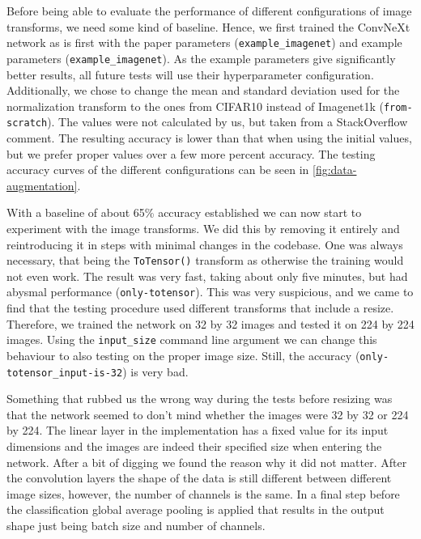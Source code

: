 \documentclass{article}
\begin{document}
    Before being able to evaluate the performance of different configurations of image transforms, we need some kind of baseline.
    Hence, we first trained the ConvNeXt network as is first with the paper parameters (\texttt{example\_imagenet}) and example parameters (\texttt{example\_imagenet}).
    As the example parameters give significantly better results, all future tests will use their hyperparameter configuration.
    Additionally, we chose to change the mean and standard deviation used for the normalization transform to the ones from CIFAR10 instead of Imagenet1k (\texttt{from-scratch}).
    The values were not calculated by us, but taken from a StackOverflow\cite{stackoverflow} comment.
    The resulting accuracy is lower than that when using the initial values, but we prefer proper values over a few more percent accuracy.
    The testing accuracy curves of the different configurations can be seen in \autoref{fig:data-augmentation}.

    With a baseline of about 65\% accuracy established we can now start to experiment with the image transforms.
    We did this by removing it entirely and reintroducing it in steps with minimal changes in the codebase.
    One was always necessary, that being the \texttt{ToTensor()} transform as otherwise the training would not even work.
    The result was very fast, taking about only five minutes, but had abysmal performance (\texttt{only-totensor}).
    This was very suspicious, and we came to find that the testing procedure used different transforms that include a resize.
    Therefore, we trained the network on 32 by 32 images and tested it on 224 by 224 images.
    Using the \texttt{input\_size} command line argument we can change this behaviour to also testing on the proper image size.
    Still, the accuracy (\texttt{only-totensor\_input-is-32}) is very bad.

    Something that rubbed us the wrong way during the tests before resizing was that the network seemed to don't mind whether the images were 32 by 32 or 224 by 224.
    The linear layer in the implementation has a fixed value for its input dimensions and the images are indeed their specified size when entering the network.
    After a bit of digging we found the reason why it did not matter.
    After the convolution layers the shape of the data is still different between different image sizes, however, the number of channels is the same.
    In a final step before the classification global average pooling is applied that results in the output shape just being batch size and number of channels.
\end{document}
